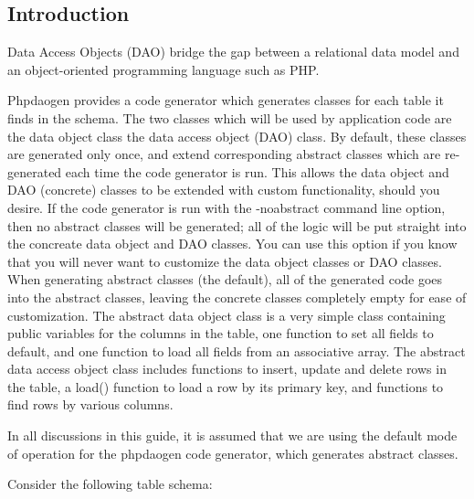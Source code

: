 \documentclass[letterpaper,10pt,english]{sphinxmanual}
\begin{document}
\subsection{Introduction}
\label{jaxFrameworkGuide:id17}
Data Access Objects (DAO) bridge the gap between a relational data model and an object-oriented
programming language such as PHP.

Phpdaogen provides a code generator which generates classes for each table it finds in the schema.
The two classes which will be used by application code are the data object class the data access
object (DAO) class.  By default, these classes are generated only once, and extend corresponding
abstract classes which are re-generated each time the code generator is run.  This allows the data
object and DAO (concrete) classes to be extended with custom functionality, should you desire.  If
the code generator is run with the -noabstract command line option, then no abstract classes will be
generated; all of the logic will be put straight into the concreate data object and DAO classes.
You can use this option if you know that you will never want to customize the data object classes or
DAO classes.  When generating abstract classes (the default), all of the generated code goes into
the abstract classes, leaving the concrete classes completely empty for ease of customization.  The
abstract data object class is a very simple class containing public variables for the columns in the
table, one function to set all fields to default, and one function to load all fields from an
associative array.  The abstract data access object class includes functions to insert, update and
delete rows in the table, a load() function to load a row by its primary key, and functions to find
rows by various columns.

In all discussions in this guide, it is assumed that we are using the default mode of operation for
the phpdaogen code generator, which generates abstract classes.

Consider the following table schema:
\end{document}
